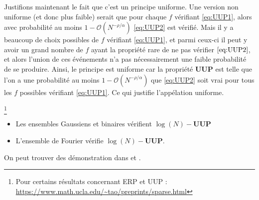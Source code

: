 \begin{remarque}
Justifions maintenant le fait que c'est un principe uniforme. 
	Une version non uniforme (et donc plus faible) serait que pour chaque $f$ vérifiant \ref{eq:UUP1}, alors avec probabilité au moins $1 -\mathcal{O}(N^{-\rho / \alpha})$  \ref{eq:UUP2} est vérifié. Mais il y a beaucoup de choix possibles de $f$ vérifiant \ref{eq:UUP1}, et parmi ceux-ci il peut y avoir un grand nombre de $f$ ayant la propriété rare de ne pas vérifier $\ref{eq:UUP2}$, et alors l'union de ces événements n'a pas nécessairement une faible probabilité de se produire.
	\newline
	Ainsi, le principe est uniforme car la propriété \textbf{UUP} est telle que l'on a une probabilité au moins $1- \mathcal{O}(N^{-\rho / \alpha})$ que \ref{eq:UUP2} soit vrai pour tous les $f$ possibles vérifiant \ref{eq:UUP1}. Ce qui justifie l'appélation uniforme.
\end{remarque}
\begin{proposition}\footnote{Pour certains résultats concernant ERP et UUP : \url{https://www.math.ucla.edu/~tao/preprints/sparse.html}}
	 
	\begin{itemize}
		\item Les ensembles Gaussiens et binaires vérifient $\log(N)-\textbf{UUP}$
		\item L'ensemble de Fourier vérifie $\log(N)-\textbf{UUP}$.
	\end{itemize}
\end{proposition}
On peut trouver des démonstration dans \cite{CT} et \cite{foucartbook}.
